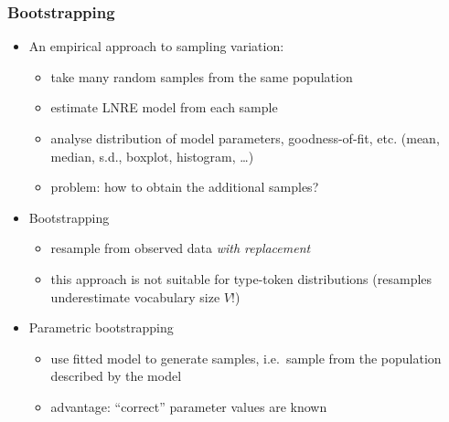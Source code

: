 \documentclass[handout,notes=show,t]{beamer} %
\begin{document}
\begin{frame}
  \frametitle{Bootstrapping}

  \begin{itemize}
  \item<1-> An empirical approach to sampling variation:
    \begin{itemize}
    \item take many random samples from the same population
    \item estimate LNRE model from each sample
    \item analyse distribution of model parameters, goodness-of-fit, etc.
      (mean, median, s.d., boxplot, histogram, \ldots)
    \item problem: how to obtain the additional samples?
    \end{itemize}
  \item<2-> Bootstrapping \citep{Efron:79}
    \begin{itemize}
    \item resample from observed data \emph{with replacement}
    \item this approach is not suitable for type-token distributions
      (resamples underestimate vocabulary size $V$!)
    \end{itemize}
  \item<3-> Parametric bootstrapping
    \begin{itemize}
    \item use fitted model to generate samples, i.e.\ sample from the population described by the model
    \item advantage: ``correct'' parameter values are known
    \end{itemize}
  \end{itemize}
\end{frame}
\end{document}
